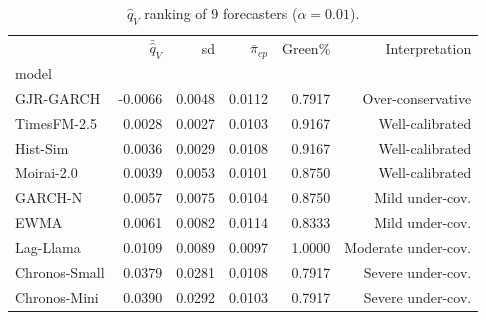 \begin{table}[htbp]
\centering
\caption{$\hat{q}_V$ ranking of 9 forecasters ($\alpha=0.01$).}
\label{tab:qv_ranking}
\footnotesize
\begin{tabular}{lrrrrr}
\toprule
 & $\bar{\hat{q}}_V$ & sd & $\bar{\pi}_{cp}$ & Green\% & Interpretation \\
model &  &  &  &  &  \\
\midrule
GJR-GARCH & -0.0066 & 0.0048 & 0.0112 & 0.7917 & Over-conservative \\
TimesFM-2.5 & 0.0028 & 0.0027 & 0.0103 & 0.9167 & Well-calibrated \\
Hist-Sim & 0.0036 & 0.0029 & 0.0108 & 0.9167 & Well-calibrated \\
Moirai-2.0 & 0.0039 & 0.0053 & 0.0101 & 0.8750 & Well-calibrated \\
GARCH-N & 0.0057 & 0.0075 & 0.0104 & 0.8750 & Mild under-cov. \\
EWMA & 0.0061 & 0.0082 & 0.0114 & 0.8333 & Mild under-cov. \\
Lag-Llama & 0.0109 & 0.0089 & 0.0097 & 1.0000 & Moderate under-cov. \\
Chronos-Small & 0.0379 & 0.0281 & 0.0108 & 0.7917 & Severe under-cov. \\
Chronos-Mini & 0.0390 & 0.0292 & 0.0103 & 0.7917 & Severe under-cov. \\
\bottomrule
\end{tabular}
\end{table}

